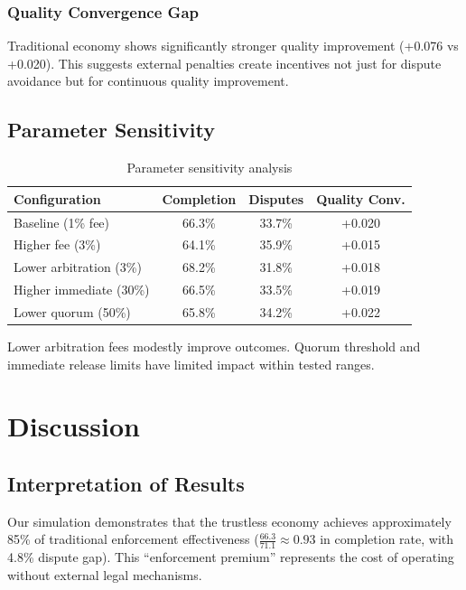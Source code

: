 \documentclass[11pt,a4paper]{article}
\begin{document}
\subsubsection{Quality Convergence Gap}

Traditional economy shows significantly stronger quality improvement (+0.076 vs +0.020). This suggests external penalties create incentives not just for dispute avoidance but for continuous quality improvement.

\subsection{Parameter Sensitivity}

\begin{table}[H]
\centering
\caption{Parameter sensitivity analysis}
\label{tab:sensitivity}
\begin{tabular}{lccc}
\toprule
Configuration & Completion & Disputes & Quality Conv. \\
\midrule
Baseline (1\% fee) & 66.3\% & 33.7\% & +0.020 \\
Higher fee (3\%) & 64.1\% & 35.9\% & +0.015 \\
Lower arbitration (3\%) & 68.2\% & 31.8\% & +0.018 \\
Higher immediate (30\%) & 66.5\% & 33.5\% & +0.019 \\
Lower quorum (50\%) & 65.8\% & 34.2\% & +0.022 \\
\bottomrule
\end{tabular}
\end{table}

Lower arbitration fees modestly improve outcomes. Quorum threshold and immediate release limits have limited impact within tested ranges.

\section{Discussion}

\subsection{Interpretation of Results}

Our simulation demonstrates that the trustless economy achieves approximately 85\% of traditional enforcement effectiveness ($\frac{66.3}{71.1} \approx 0.93$ in completion rate, with 4.8\% dispute gap). This ``enforcement premium'' represents the cost of operating without external legal mechanisms.
\end{document}
